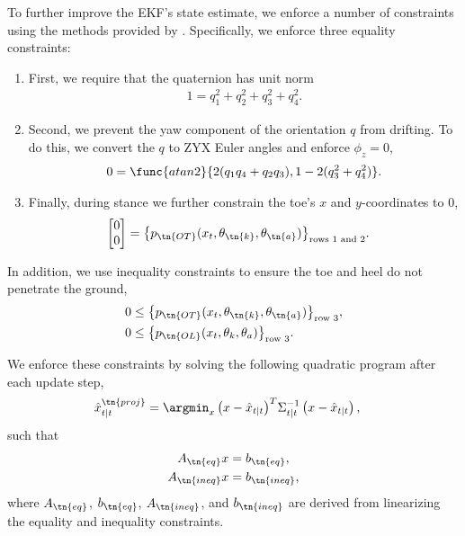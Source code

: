 To further improve the EKF's state estimate, we enforce a number of
constraints using the methods provided by \citet{gupta2007kalman}. Specifically,
we enforce three equality constraints:
\begin{enumerate}
\item First, we require that the quaternion has unit norm
\begin{align}
    1 = q_1^2 + q_2^2 + q_3^2 + q_4^2.
\end{align}

\item Second, we prevent the yaw component of the orientation $q$ from drifting.
To do this, we convert the $q$ to ZYX Euler angles and enforce $\phi_z = 0$, 
\begin{align}
    0 = \func{atan2}{2 (q_1 q_4 + q_2 q_3), 1 - 2 (q_3^2 + q_4^2)}.
\end{align}

\item Finally, during stance we further constrain the toe's $x$ and
$y$-coordinates to 0,
\begin{align}
    \begin{bmatrix} 0 \\ 0 \end{bmatrix} 
        &= {\left\{p_\tn{OT}(x_t, \theta_\tn{k}, \theta_\tn{a}) 
            \right\}}_\textrm{rows 1 and 2}.
\end{align}
\end{enumerate}

\noindent In addition, we use inequality constraints to ensure the toe and heel
do not penetrate the ground,
\begin{align}
    0 &\le {\left\{p_\tn{OT}(x_t, \theta_\tn{k}, \theta_\tn{a}) 
        \right\}}_\textrm{row 3} ,\\
    0 &\le {\left\{p_\tn{OL}(x_t, \theta_k, \theta_a) 
        \right\}}_\textrm{row 3}.
\end{align}

\noindent We enforce these constraints by solving the following quadratic
program after each update step,
\begin{align}
\hat{x}_{t|t}^\tn{proj} 
    &= {\argmin_x \left(x - \hat{x}_{t|t} \right)}^T \Sigma_{t|t}^{-1} 
        \left(x - \hat{x}_{t|t} \right),
\end{align}
such that
\begin{align}
    A_\tn{eq} x &= b_\tn{eq}, \\
    A_\tn{ineq} x &= b_\tn{ineq},
\end{align}
where $A_\tn{eq}$,  $b_\tn{eq}$, $A_\tn{ineq}$, and $b_\tn{ineq}$ are derived
from linearizing the equality and inequality constraints.

